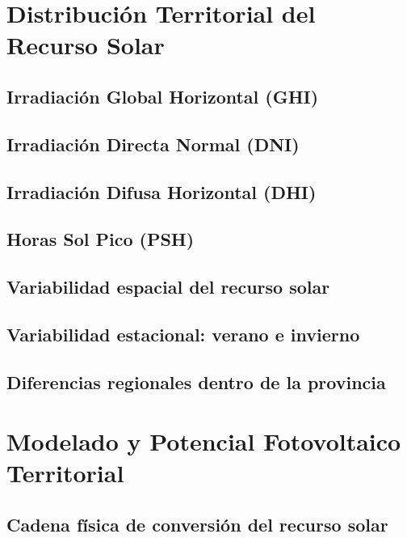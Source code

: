 \documentclass[11pt,a4paper]{article}
\begin{document}

\section{Distribución Territorial del Recurso Solar}

\subsection{Irradiación Global Horizontal (GHI)}
\subsection{Irradiación Directa Normal (DNI)}
\subsection{Irradiación Difusa Horizontal (DHI)}
\subsection{Horas Sol Pico (PSH)}
\subsection{Variabilidad espacial del recurso solar}
\subsection{Variabilidad estacional: verano e invierno}
\subsection{Diferencias regionales dentro de la provincia}



\section{Modelado y Potencial Fotovoltaico Territorial}

\subsection{Cadena física de conversión del recurso solar}
\end{document}
